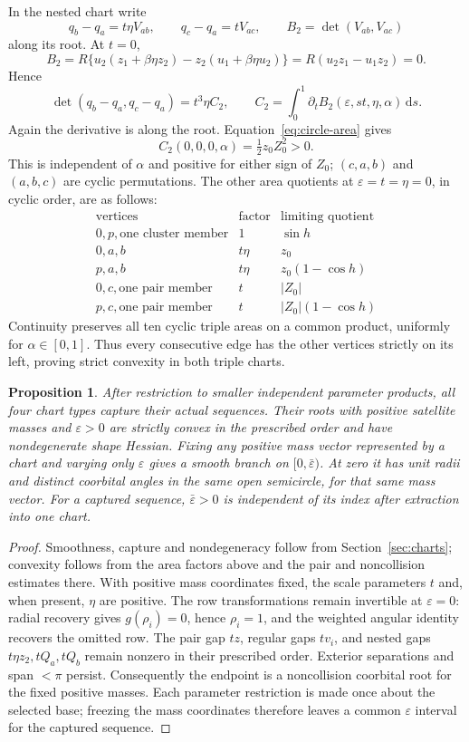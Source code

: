 \documentclass[11pt,a4paper]{article}
\numberwithin{equation}{section}
\newtheorem{proposition}[theorem]{Proposition}
\theoremstyle{remark}
\newcommand{\eps}{\varepsilon}
\newcommand{\dd}{\,\mathrm d}
\begin{document}
In the nested chart write
\[
 q_b-q_a=t\eta V_{ab},\qquad q_c-q_a=tV_{ac},\qquad
 B_2=\det(V_{ab},V_{ac})
\]
along its root. At $t=0$,
\[
 B_2=R\{u_2(z_1+\beta\eta z_2)-z_2(u_1+\beta\eta u_2)\}
    =R(u_2z_1-u_1z_2)=0.
\]
Hence
\begin{equation}\label{eq:nest-area}
 \det(q_b-q_a,q_c-q_a)=t^3\eta C_2,\qquad
 C_2=\int_0^1\partial_tB_2(\eps,st,\eta,\alpha)\dd s.
\end{equation}
Again the derivative is along the root. Equation~\eqref{eq:circle-area} gives
\[
 C_2(0,0,0,\alpha)=\tfrac12z_0Z_0^2>0.
\]
This is independent of $\alpha$ and positive for either sign of $Z_0$; $(c,a,b)$ and $(a,b,c)$ are cyclic permutations.
The other area quotients at $\eps=t=\eta=0$, in cyclic order, are as follows:
\[
\begin{array}{c|c|c}
 \text{vertices}&\text{factor}&\text{limiting quotient}\\\hline
 0,p,\text{one cluster member}&1&\sin h\\
 0,a,b&t\eta&z_0\\
 p,a,b&t\eta&z_0(1-\cos h)\\
 0,c,\text{one pair member}&t&|Z_0|\\
 p,c,\text{one pair member}&t&|Z_0|(1-\cos h)
\end{array}
\]
Continuity preserves all ten cyclic triple areas on a common product, uniformly for $\alpha\in[0,1]$.
Thus every consecutive edge has the other vertices strictly on its left, proving strict convexity in both triple charts.

\begin{proposition}\label{prop:chart-interface}
After restriction to smaller independent parameter products, all four chart types capture their actual sequences. Their roots with positive satellite masses and $\eps>0$ are strictly convex in the prescribed order and have nondegenerate shape Hessian.
Fixing any positive mass vector represented by a chart and varying only $\eps$ gives a smooth branch on $[0,\bar\eps)$. At zero it has unit radii and distinct coorbital angles in the same open semicircle, for that same mass vector. For a captured sequence, $\bar\eps>0$ is independent of its index after extraction into one chart.
\end{proposition}
\begin{proof}
Smoothness, capture and nondegeneracy follow from Section~\ref{sec:charts}; convexity follows from the area factors above and the pair and noncollision estimates there.
With positive mass coordinates fixed, the scale parameters $t$ and, when present, $\eta$ are positive. The row transformations remain invertible at $\eps=0$: radial recovery gives $g(\rho_i)=0$, hence $\rho_i=1$, and the weighted angular identity recovers the omitted row.
The pair gap $tz$, regular gaps $tv_i$, and nested gaps $t\eta z_2,tQ_a,tQ_b$ remain nonzero in their prescribed order. Exterior separations and span $<\pi$ persist.
Consequently the endpoint is a noncollision coorbital root for the fixed positive masses.
Each parameter restriction is made once about the selected base; freezing the mass coordinates therefore leaves a common $\eps$ interval for the captured sequence.
\end{proof}
\end{document}
